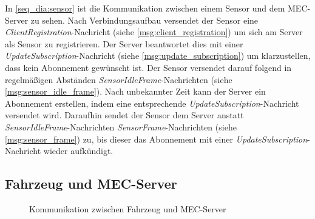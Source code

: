 In \autoref{seq_dia:sensor} ist die Kommunikation zwischen einem Sensor und dem MEC-Server zu sehen.
Nach Verbindungsaufbau versendet der Sensor eine \textit{ClientRegistration}-Nachricht (siehe \autoref{msg:client_registration}) um sich am Server als Sensor zu registrieren.
Der Server beantwortet dies mit einer \textit{UpdateSubscription}-Nachricht (siehe \autoref{msg:update_subscription}) um klarzustellen, dass kein Abonnement gewünscht ist.
Der Sensor versendet darauf folgend in regelmäßigen Abständen \textit{SensorIdleFrame}-Nachrichten (siehe \autoref{msg:sensor_idle_frame}).
Nach unbekannter Zeit kann der Server ein Abonnement erstellen, indem eine entsprechende \textit{UpdateSubscription}-Nachricht versendet wird.
Daraufhin sendet der Sensor dem Server anstatt \textit{SensorIdleFrame}-Nachrichten \textit{SensorFrame}-Nachrichten (siehe \autoref{msg:sensor_frame}) zu, bis dieser das Abonnement mit einer \textit{UpdateSubscription}-Nachricht wieder aufkündigt.

\subsection{Fahrzeug und MEC-Server}

\begin{figure}[H]
	\centering
	\caption{Kommunikation zwischen Fahrzeug und MEC-Server}
	\label{seq_dia:vehicle}
\end{figure}

